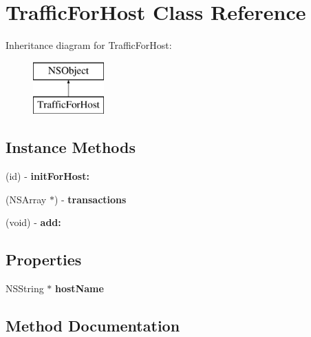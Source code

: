 \hypertarget{interface_traffic_for_host}{}\section{Traffic\+For\+Host Class Reference}
\label{interface_traffic_for_host}
Inheritance diagram for Traffic\+For\+Host\+:\begin{figure}[H]
\begin{center}
\leavevmode
\includegraphics[height=2.000000cm]{interface_traffic_for_host}
\end{center}
\end{figure}
\subsection*{Instance Methods}
\begin{DoxyCompactItemize}
\item 
(id) -\/ {\bfseries init\+For\+Host\+:}
\item 
\mbox{\label{interface_traffic_for_host_ae7df7efdaca12650330fc328a070da69}} 
(N\+S\+Array $\ast$) -\/ {\bfseries transactions}
\item 
\mbox{\label{interface_traffic_for_host_aca1f0c56a9eec3fb20e5f4fe95383f10}} 
(void) -\/ {\bfseries add\+:}
\end{DoxyCompactItemize}
\subsection*{Properties}
\begin{DoxyCompactItemize}
\item 
\mbox{\label{interface_traffic_for_host_a6d43931e2c34fa49aaf7597673a84860}} 
N\+S\+String $\ast$ {\bfseries host\+Name}
\end{DoxyCompactItemize}


\subsection{Method Documentation}
\mbox{\label{interface_traffic_for_host_acf637083d9d1ae97550a6aa5ef73546d}} 
